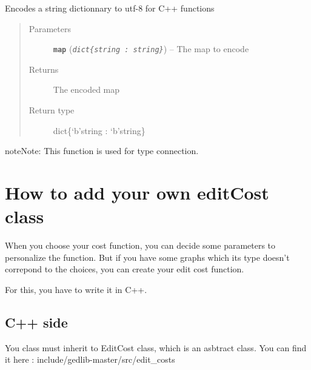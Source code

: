 \documentclass[letterpaper,10pt,english]{sphinxmanual}
\begin{document}

\begin{fulllineitems}
\label{doc:PythonGedLib.encodeYourMap}
Encodes a string dictionnary to utf-8 for C++ functions
\begin{quote}\begin{description}
\item[{Parameters}] \leavevmode
\textbf{\texttt{map}} (\emph{\texttt{dict\{string : string\}}}) -- The map to encode

\item[{Returns}] \leavevmode
The encoded map

\item[{Return type}] \leavevmode
dict\{`b'string : `b'string\}

\end{description}\end{quote}

\begin{notice}{note}{Note:}
This function is used for type connection.
\end{notice}

\end{fulllineitems}



\chapter{How to add your own editCost class}
\label{editcost::doc}\label{editcost:how-to-add-your-own-editcost-class}
When you choose your cost function, you can decide some parameters to personalize the function. But if you have some graphs which its type doesn't correpond to the choices, you can create your edit cost function.

For this, you have to write it in C++.


\section{C++ side}
\label{editcost:c-side}
You class must inherit to EditCost class, which is an asbtract class. You can find it here : include/gedlib-master/src/edit\_costs
\end{document}

